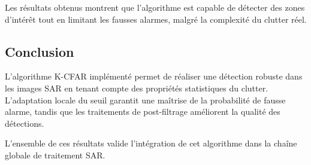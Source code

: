 Les résultats obtenus montrent que l’algorithme est capable de détecter des zones d’intérêt tout en limitant les fausses alarmes, malgré la complexité du clutter réel.


\subsection{Conclusion}

L’algorithme K-CFAR implémenté permet de réaliser une détection robuste dans les images SAR en tenant compte des propriétés statistiques du clutter. L’adaptation locale du seuil garantit une maîtrise de la probabilité de fausse alarme, tandis que les traitements de post-filtrage améliorent la qualité des détections.

L’ensemble de ces résultats valide l’intégration de cet algorithme dans la chaîne globale de traitement SAR.